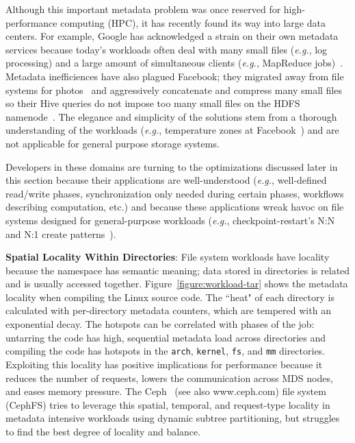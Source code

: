 Although this important metadata problem was once reserved for high-performance
computing (HPC), it has recently found its way into large data centers. For
example, Google has acknowledged a strain on their own metadata services
because today's workloads often deal with many small files ({\it e.g.}, log
processing) and a large amount of simultaneous clients ({\it e.g.}, MapReduce
jobs)~\cite{mckusick:acm2010-gfs-evolution}. Metadata inefficiences have also
plagued Facebook; they migrated away from file systems for
photos~\cite{beaver:osdi2010-haystack} and aggressively concatenate and
compress many small files so their Hive queries do not impose too many small
files on the HDFS namenode~\cite{thusoo:sigmod2010-facebook-infrastructure}.
The elegance and simplicity of the solutions stem from a thorough understanding
of the workloads ({\it e.g.}, temperature zones at
Facebook~\cite{muralidhar:osdi2014-f4}) and are not applicable for general
purpose storage systems. 

Developers in these domains are turning to the optimizations discussed later in
this section because their applications are well-understood ({\it e.g.},
well-defined read/write phases, synchronization only needed during certain
phases, workflows describing computation, etc.) and because these applications
wreak havoc on file systems designed for general-purpose workloads ({\it e.g.},
checkpoint-restart's N:N and N:1 create patterns~\cite{bent_plfs_2009}).

\textbf{Spatial Locality Within Directories}: File system workloads have
locality because the namespace has semantic meaning; data stored in directories
is related and is usually accessed together.  Figure~\ref{figure:workload-tar}
shows the metadata locality when compiling the Linux source code. The ``heat"
of each directory is calculated with per-directory metadata counters, which are
tempered with an exponential decay.  The hotspots can be correlated with phases
of the job: untarring the code has high, sequential metadata load across
directories and compiling the code has hotspots in the \texttt{arch},
\texttt{kernel}, \texttt{fs}, and \texttt{mm} directories. Exploiting this
locality has positive implications for performance because it reduces the
number of requests, lowers the communication across MDS nodes, and eases memory
pressure. The Ceph~\cite{weil:osdi2006-ceph} (see also www.ceph.com) file
system (CephFS) tries to leverage this spatial, temporal, and request-type
locality in metadata intensive workloads using dynamic subtree partitioning,
but struggles to find the best degree of locality and balance.

